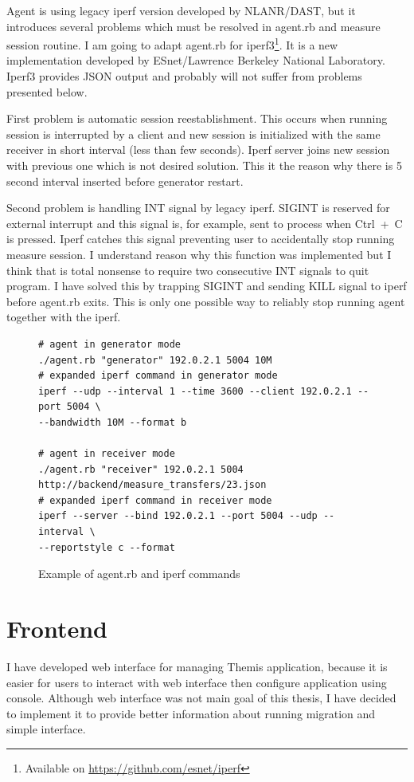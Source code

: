 Agent is using legacy iperf version developed by NLANR/DAST, but it introduces several problems which must be resolved in agent.rb and measure session routine. I am going to adapt agent.rb for iperf3\footnote{Available on \url{https://github.com/esnet/iperf}}. It is a new implementation developed by ESnet/Lawrence Berkeley National Laboratory. Iperf3 provides \Ac{JSON} output and probably will not suffer from problems presented below.

First problem is automatic session reestablishment. This occurs when running session is interrupted by a client and new session is initialized with the same receiver in short interval (less than few seconds). Iperf server joins new session with previous one which is not desired solution. This it the reason why there is 5 second interval inserted before generator restart. 

Second problem is handling INT signal by legacy iperf. SIGINT is reserved for external interrupt and this signal is, for example, sent to process when \mbox{Ctrl + C} is pressed. Iperf catches this signal preventing user to accidentally stop running measure session. I understand reason why this function was implemented but I think that is total nonsense to require two consecutive INT signals to quit program. I have solved this by trapping SIGINT and sending KILL signal to iperf before agent.rb exits. This is only one possible way to reliably stop running agent together with the iperf.

\begin{figure}[htb]
\caption{Example of agent.rb and iperf commands}
\label{code:fw}
\begin{verbatim}
# agent in generator mode
./agent.rb "generator" 192.0.2.1 5004 10M
# expanded iperf command in generator mode
iperf --udp --interval 1 --time 3600 --client 192.0.2.1 --port 5004 \
--bandwidth 10M --format b
	
# agent in receiver mode
./agent.rb "receiver" 192.0.2.1 5004 http://backend/measure_transfers/23.json
# expanded iperf command in receiver mode
iperf --server --bind 192.0.2.1 --port 5004 --udp --interval \
--reportstyle c --format
\end{verbatim}
\end{figure}



\section{Frontend}
I have developed web interface for managing Themis application, because it is easier for users to interact with web interface then configure application using console. Although web interface was not main goal of this thesis, I have decided to implement it to provide better information about running migration and simple interface.

